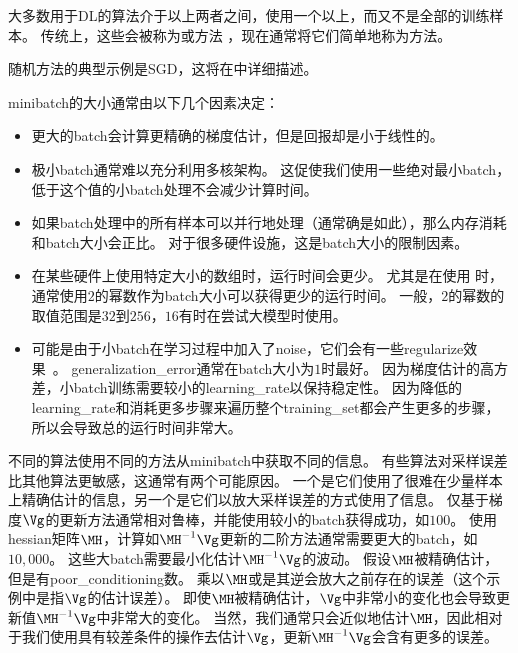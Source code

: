 大多数用于\gls{DL}的算法介于以上两者之间，使用一个以上，而又不是全部的训练样本。
传统上，这些会被称为或方法 ，现在通常将它们简单地称为方法。


随机方法的典型示例是\gls{SGD}，这将在中详细描述。

\gls{minibatch}的大小通常由以下几个因素决定：
\begin{itemize}
    \item 更大的\gls{batch}会计算更精确的梯度估计，但是回报却是小于线性的。
    
    \item 极小\gls{batch}通常难以充分利用多核架构。
    这促使我们使用一些绝对最小\gls{batch}，低于这个值的小\gls{batch}处理不会减少计算时间。
    
    \item 如果\gls{batch}处理中的所有样本可以并行地处理（通常确是如此），那么内存消耗和\gls{batch}大小会正比。
    对于很多硬件设施，这是\gls{batch}大小的限制因素。
    
    \item 在某些硬件上使用特定大小的数组时，运行时间会更少。
    尤其是在使用\,\,时，通常使用$2$的幂数作为\gls{batch}大小可以获得更少的运行时间。
    一般，$2$的幂数的取值范围是$32$到$256$，$16$有时在尝试大模型时使用。
    \item 
    可能是由于小\gls{batch}在学习过程中加入了\gls{noise}，它们会有一些\gls{regularize}效果~\citep{Wilson-Martinez-2003}。
    \gls{generalization_error}通常在\gls{batch}大小为$1$时最好。
    因为梯度估计的高方差，小\gls{batch}训练需要较小的\gls{learning_rate}以保持稳定性。
    因为降低的\gls{learning_rate}和消耗更多步骤来遍历整个\gls{training_set}都会产生更多的步骤，所以会导致总的运行时间非常大。
\end{itemize}


不同的算法使用不同的方法从\gls{minibatch}中获取不同的信息。
有些算法对采样误差比其他算法更敏感，这通常有两个可能原因。
一个是它们使用了很难在少量样本上精确估计的信息，另一个是它们以放大采样误差的方式使用了信息。
仅基于梯度$\Vg$的更新方法通常相对鲁棒，并能使用较小的\gls{batch}获得成功，如$100$。
使用\gls{hessian}矩阵$\MH$，计算如$\MH^{-1}\Vg$更新的二阶方法通常需要更大的\gls{batch}，如$10,000$。
这些大\gls{batch}需要最小化估计$\MH^{-1}\Vg$的波动。
假设$\MH$被精确估计，但是有\gls{poor_conditioning}数。
乘以$\MH$或是其逆会放大之前存在的误差（这个示例中是指$\Vg$的估计误差）。
即使$\MH$被精确估计，$\Vg$中非常小的变化也会导致更新值$\MH^{-1}\Vg$中非常大的变化。
当然，我们通常只会近似地估计$\MH$，因此相对于我们使用具有较差条件的操作去估计$\Vg$，更新$\MH^{-1}\Vg$会含有更多的误差。

